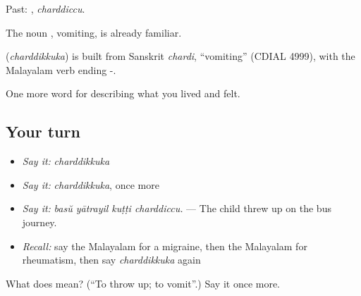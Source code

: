 Past: , \emph{charddiccu}.

The noun , vomiting, is already familiar.

\begin{cousinweb}
\textbf{} (\emph{charddikkuka}) is built from Sanskrit \emph{chardi}, \textquotedblleft{}vomiting\textquotedblright{} (CDIAL 4999), with the Malayalam verb ending -.
\end{cousinweb}

\begin{grammarlens}[title={What you've built}]
One more word for describing what you lived and felt.
\end{grammarlens}

\subsection*{Your turn}
\begin{itemize}
\raggedright
  \item \emph{Say it:} \emph{charddikkuka}
  \item \emph{Say it:} \emph{charddikkuka}, once more
  \item \emph{Say it:} \emph{basŭ yātrayil kuṭṭi charddiccu.} — The child threw up on the bus journey.
  \item \emph{Recall:} say the Malayalam for a migraine, then the Malayalam for rheumatism, then say \emph{charddikkuka} again
\end{itemize}

\begin{tcolorbox}[breakable,colback=teal!4,colframe=teal!35!black,title={Before you move on}]
What does  mean? (\textquotedblleft{}To throw up; to vomit\textquotedblright{}.) Say it once more.
\end{tcolorbox}
